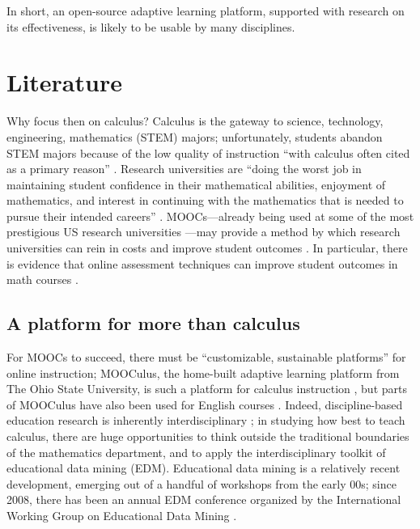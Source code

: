 \documentclass[12pt]{article}
\begin{document}
In short, an open-source adaptive learning platform, supported with
research on its effectiveness, is likely to be usable by many
disciplines.

\section{Literature}

Why focus then on calculus?  Calculus is the gateway to science,
technology, engineering, mathematics (STEM) majors; unfortunately,
students abandon STEM majors because of the low quality of instruction
``with calculus often cited as a primary
reason'' \parencite{calculus-programs}.  Research universities are
``doing the worst job in maintaining student confidence in their
mathematical abilities, enjoyment of mathematics, and interest in
continuing with the mathematics that is needed to pursue their
intended careers'' \parencite{calculus-students}.  MOOCs---already
being used at some of the most prestigious US research
universities \parencite{morris2013moocs}---may provide a method by
which research universities can rein in costs and improve student
outcomes \parencite{bowen2013higher}.  In particular, there is
evidence that online assessment techniques can improve student
outcomes in math courses \parencite{angus2009does}.

\subsection{A platform for more than calculus}

For MOOCs to succeed, there must be ``customizable, sustainable
platforms'' \parencite{bowen2013higher} for online instruction;
MOOCulus, the home-built adaptive learning platform from The Ohio
State University, is such a platform for calculus
instruction \parencite{evans}, but parts of MOOCulus have also been
used for English courses \parencite{gates-foundation-grant}.  Indeed,
discipline-based education research is inherently interdisciplinary
\cite{dber-report}; in studying how best to teach calculus, there are
huge opportunities to think outside the traditional boundaries of the
mathematics department, and to apply the interdisciplinary toolkit of
educational data mining (EDM).  Educational data mining is a
relatively recent development, emerging out of a handful of workshops
from the early 00s; since 2008, there has been an annual EDM
conference organized by the International Working Group on Educational
Data Mining \parencite{WIDM:WIDM1075}.
\end{document}
